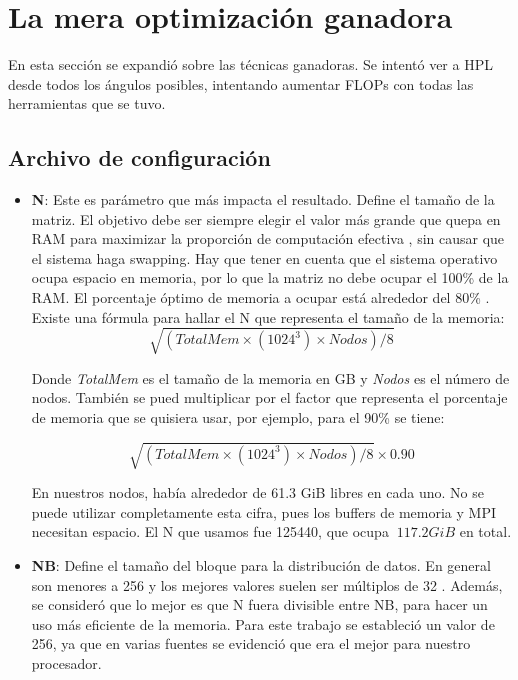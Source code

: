 \section{La mera optimización ganadora}
En esta sección se expandió sobre las técnicas ganadoras. Se intentó ver a HPL desde todos los ángulos posibles, intentando aumentar FLOPs con todas las herramientas que se tuvo.

\subsection{Archivo de configuración}

\begin{itemize}
	\item \textbf{N}: Este es parámetro que más impacta el resultado. Define el tamaño de la matriz. El objetivo debe ser siempre elegir el valor más grande que quepa en RAM para maximizar la proporción de computación efectiva \cite{studentasc}, sin causar que el sistema haga swapping. Hay que tener en cuenta que el sistema operativo ocupa espacio en memoria, por lo que la matriz no debe ocupar el 100\% de la RAM. El porcentaje óptimo de memoria a ocupar está alrededor del 80\% \cite{studentasc}.
	Existe una fórmula para hallar el N que representa el tamaño de la memoria:
    \begin{equation*}
        \sqrt{(TotalMem \times (1024^3) \times Nodos) /8}
    \end{equation*}
    
    Donde \textit{TotalMem} es el tamaño de la memoria en GB y \textit{Nodos} es el número de nodos. También se pued multiplicar por el factor que representa el porcentaje de memoria que se quisiera usar, por ejemplo, para el 90\% se tiene:
    
    \begin{equation*}
        \sqrt{(TotalMem \times (1024^3) \times Nodos) /8} \times 0.90
    \end{equation*}
    
    En nuestros nodos, había alrededor de 61.3 GiB libres en cada uno. No se puede utilizar completamente esta cifra, pues los buffers de memoria y MPI necesitan espacio. El N que usamos fue 125440, que ocupa $~117.2 GiB$ en total.
	
	\item \textbf{NB}: Define el tamaño del bloque para la distribución de datos. En general son menores a 256 y los mejores valores suelen ser múltiplos de 32 \cite{netlib-hpl-faq}. Además, se consideró que lo mejor es que N fuera divisible entre NB, para hacer un uso más eficiente de la memoria. Para este trabajo se estableció un valor de 256, ya que en varias fuentes se evidenció que era el mejor para nuestro procesador.
	

\end{itemize}
